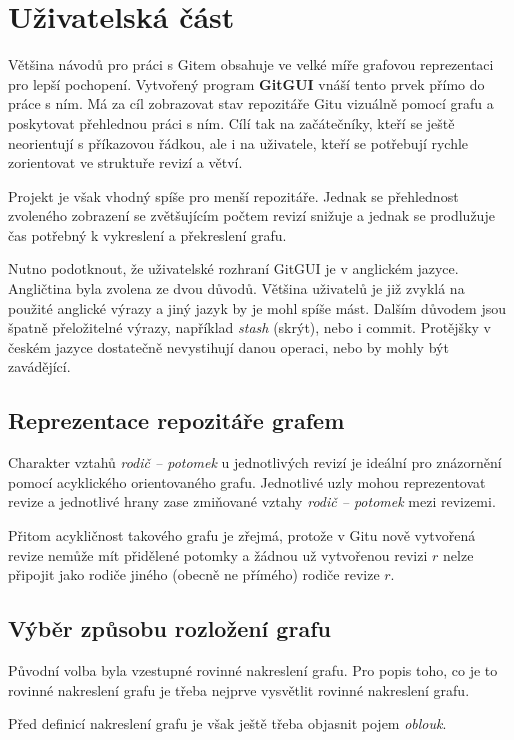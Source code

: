 \documentclass[
  biblatex,
  glossaries,
  index
]{kidiplom}
\begin{document}
\section{Uživatelská část}
Většina návodů pro práci s Gitem obsahuje ve velké míře grafovou reprezentaci pro lepší pochopení. Vytvořený program \textbf{GitGUI} vnáší tento prvek přímo do práce s ním. Má za cíl zobrazovat stav repozitáře Gitu vizuálně pomocí grafu a poskytovat přehlednou práci s ním. Cílí tak na začátečníky, kteří se ještě neorientují s příkazovou řádkou, ale i na uživatele, kteří se potřebují rychle zorientovat ve struktuře revizí a větví.

Projekt je však vhodný spíše pro menší repozitáře. Jednak se přehlednost zvoleného zobrazení se zvětšujícím počtem revizí snižuje a jednak se prodlužuje čas potřebný k vykreslení a překreslení grafu.

Nutno podotknout, že uživatelské rozhraní GitGUI je v anglickém jazyce. Angličtina byla zvolena ze dvou důvodů. Většina uživatelů je již zvyklá na použité anglické výrazy a jiný jazyk by je mohl spíše mást. Dalším důvodem jsou špatně přeložitelné výrazy, například \textit{stash} (skrýt), nebo i commit. Protějšky v českém jazyce dostatečně nevystihují danou operaci, nebo by mohly být zavádějící.

\subsection{Reprezentace repozitáře grafem}
Charakter vztahů {\it rodič -- potomek} u jednotlivých revizí je ideální pro znázornění pomocí acyklického orientovaného grafu. Jednotlivé uzly mohou reprezentovat revize a jednotlivé hrany zase zmiňované vztahy {\it rodič -- potomek} mezi revizemi.

Přitom acykličnost takového grafu je zřejmá, protože v Gitu nově vytvořená revize nemůže mít přidělené potomky a žádnou už vytvořenou revizi $r$ nelze připojit jako rodiče jiného (obecně ne přímého) rodiče revize $r$.

\subsection{Výběr způsobu rozložení grafu}

Původní volba byla vzestupné rovinné nakreslení grafu. Pro popis toho, co je to rovinné nakreslení grafu je třeba nejprve vysvětlit rovinné nakreslení grafu.

Před definicí nakreslení grafu je však ještě třeba objasnit pojem {\it oblouk}.
\end{document}
